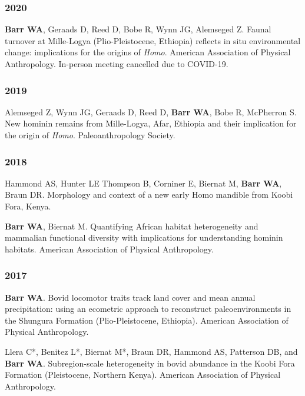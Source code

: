 \documentclass{article}
\begin{document}
\begin{etaremune}
\subsubsection*{2020}

\item {\bfseries Barr WA}, Geraads D, Reed D, Bobe R, Wynn JG, Alemseged Z. Faunal turnover at Mille-Logya (Plio-Pleistocene, Ethiopia) reflects in situ environmental change: implications for the origins of \emph{Homo}. American Association of Physical Anthropology. In-person meeting cancelled due to COVID-19.

\subsubsection*{2019}
\item Alemseged Z, Wynn JG, Geraads D, Reed D, {\bfseries Barr WA}, Bobe R, McPherron S. New hominin remains from Mille-Logya, Afar, Ethiopia and their implication for the origin of \emph{Homo}. Paleoanthropology Society.

\subsubsection*{2018}

\item Hammond AS, Hunter LE Thompson B, Corniner E, Biernat M, {\bfseries Barr WA}, Braun DR. Morphology and context of a new early Homo mandible from Koobi Fora, Kenya.

\item {\bfseries Barr WA}, Biernat M. Quantifying African habitat heterogeneity and mammalian functional diversity with implications for understanding hominin habitats. American Association of Physical Anthropology.

\subsubsection*{2017}

\item {\bfseries Barr WA}. Bovid locomotor traits track land cover and mean annual precipitation: using an ecometric approach to reconstruct paleoenvironments in the Shungura Formation (Plio-Pleistocene, Ethiopia). American Association of Physical Anthropology.

\item Llera C*, Benitez L*, Biernat M*, Braun DR,  Hammond AS, Patterson DB, and {\bfseries Barr WA}. Subregion-scale heterogeneity in bovid abundance in the Koobi Fora Formation (Pleistocene, Northern Kenya).  American Association of Physical Anthropology.


\end{etaremune}
\end{document}
